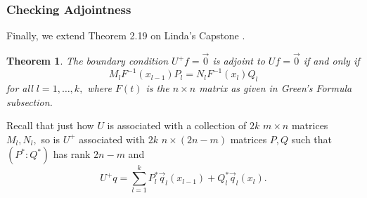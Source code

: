 \documentclass[11pt,reqno,oneside,a4paper]{article}
\theoremstyle{plain} %
\newtheorem{theorem}{Theorem}
\theoremstyle{definition}
\theoremstyle{remark}
\begin{document}
\subsubsection*{Checking Adjointness}

Finally, we extend Theorem 2.19 on Linda's Capstone \cite{linfan}. 
\newline
\begin{theorem}
The boundary condition $U^+f = \vec{0}$ is adjoint to $Uf = \vec{0}$ if and only if \[ M_lF^{-1}(x_{l-1})P_l = N_l F^{-1}(x_l)Q_l \] for all $l = 1, \ldots, k,$ where $F(t)$ is the $n\times n$ matrix as given in Green's Formula subsection.  
\end{theorem}
Recall that just how $U$ is associated with a collection of $2k$ $m\times n$ matrices $M_l, N_l,$ so is $U^+$ associated with $2k$ $n\times(2n-m)$ matrices $P,Q$ such that $(P^{*}:Q^*)$ has rank $2n-m$ and 
\[ U^+q = \sum^k_{l=1} P^*_l \vec{q}_l(x_{l-1}) + Q^*_l \vec{q}_l(x_l). \]
\end{document}
